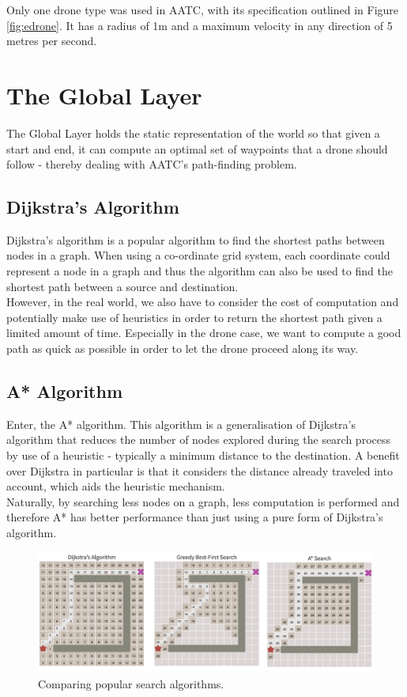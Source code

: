 \documentclass[a4paper,11pt,titlepage]{report}
\begin{document}
Only one drone type was used in AATC, with its specification outlined in Figure \ref{fig:edrone}. It has a radius of 1m and a maximum velocity in any direction of 5 metres per second.

\section{The Global Layer}
The Global Layer holds the static representation of the world so that given a start and end, it can compute an optimal set of waypoints that a drone should follow - thereby dealing with AATC's path-finding problem.

\subsection{Dijkstra's Algorithm}
Dijkstra's algorithm is a popular algorithm to find the shortest paths between nodes in a graph. When using a co-ordinate grid system, each coordinate could represent a node in a graph and thus the algorithm can also be used to find the shortest path between a source and destination. \\

However, in the real world, we also have to consider the cost of computation and potentially make use of heuristics in order to return the shortest path given a limited amount of time. Especially in the drone case, we want to compute a good path as quick as possible in order to let the drone proceed along its way.

\subsection{A* Algorithm}
Enter, the A* algorithm. This algorithm is a generalisation of Dijkstra's algorithm that reduces the number of nodes explored during the search process by use of a heuristic - typically a minimum distance to the destination. A benefit over Dijkstra in particular is that it considers the distance already traveled into account, which aids the heuristic mechanism. \\

Naturally, by searching less nodes on a graph, less computation is performed and therefore A* has better performance than just using a pure form of Dijkstra's algorithm.

\begin{figure}[!hbpt]
  \center
  \includegraphics[width=\linewidth]{img/search_comparison.png}
  \caption{Comparing popular search algorithms. \cite{Balaji2017}}
  \label{fig:search_comparison}
\end{figure}
\end{document}
